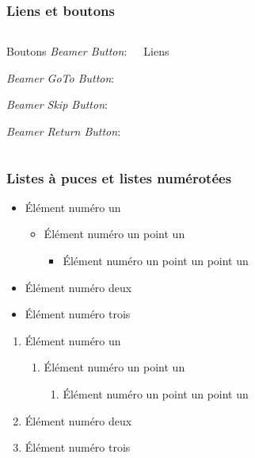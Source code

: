 \documentclass[aspectratio=1610,compress,t,english,french]{beamer}
\begin{document}
\begin{frame}
\frametitle{Liens et boutons}
	\begin{columns}
		\vspace{-7mm}
		\begin{block}{Boutons}
			\emph{Beamer Button}:\\			
			\hyperlink{paletteCouleurs}{}
			
			\emph{Beamer GoTo Button}:\\
			\hyperlink{structureDiapos}{}
			
			\emph{Beamer Skip Button}:\\
			\hyperlink{elementsInterface}{}
			
			\emph{Beamer Return Button}:\\
			\hyperlink{tdm}{}
		\end{block}
		\vspace{-7mm}
		\begin{block}{Liens}
			
		\end{block}
	\end{columns}

\end{frame}

\begin{frame}
\frametitle{Listes à puces et listes numérotées}
	
	\begin{itemize}
		\item Élément numéro un
			\begin{itemize}
				\item Élément numéro un point un
					\begin{itemize}
						\item Élément numéro un point un point un
					\end{itemize}
			\end{itemize}
		\item Élément numéro deux
		\item Élément numéro trois
	\end{itemize}

	\begin{enumerate}
		\item Élément numéro un
		\begin{enumerate}
			\item Élément numéro un point un
			\begin{enumerate}
				\item Élément numéro un point un point un
			\end{enumerate}
		\end{enumerate}
		\item Élément numéro deux
		\item Élément numéro trois
	\end{enumerate}

\end{frame}
\end{document}
